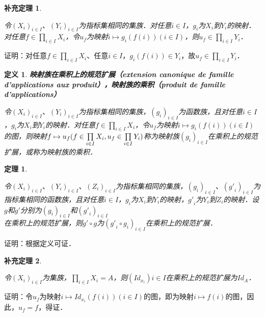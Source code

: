 \documentclass[12pt, a4paper, oneside]{book}
\newtheorem{theo}{定理}
\newtheorem{cor}{补充定理}
\newtheorem{de}{定义}
\begin{document}
			\begin{cor}\label{cor140}
				\hfill\par
				令$(X_i)_{i\in I}$、$(Y_i)_{i\in I}$为指标集相同的集族．对任意$i\in I$，$g_i$为$X_i$到$Y_i$的映射．对任意$f\in \prod\limits_{i\in I}X_i$，令$u_f$为映射$i\mapsto g_i(f(i))(i\in I)$，则$u_f\in \prod\limits_{i\in I}Y_i$．
			\end{cor}
			证明：对任意$f\in \prod\limits_{i\in I}X_i$、任意$i\in I$，$g_i(f(i))\in Y_i$，故$u_f\in \prod\limits_{i\in I}Y_i$．
			
			\begin{de}
				\textbf{映射族在乘积上的规范扩展（extension canonique de famille d'applications aux produit），映射族的乘积（produit de famille d'applications）}
				\par
				令$(X_i)_{i\in I}$、$(Y_i)_{i\in I}$为指标集相同的集族，$(g_i)_{i\in I}$为函数族，且对任意$i\in I$，$g_i$为$X_i$到$Y_i$的映射．对任意$f\in \prod\limits_{i\in I}X_i$，令$u_f$为映射$i\mapsto g_i(f(i))(i\in I)$的图，则映射$f\mapsto u_f(f\in \prod\limits_{i\in I}X_i, u_f\\\in \prod\limits_{i\in I}Y_i)$称为映射族$(g_i)_{i\in I}$在乘积上的规范扩展，或称为映射族的乘积．
			\end{de}
			
			\begin{theo}\label{theo54}
				\hfill\par
				令$(X_i)_{i\in I}$、$(Y_i)_{i\in I}$、$(Z_i)_{i\in I}$为指标集相同的集族，$(g_i)_{i\in I}$、$({g'}_i)_{i\in I}$为指标集相同的函数族，且对任意$i\in I$，$g_i$为$X_i$到$Y_i$的映射，${g'}_i$为$Y_i$到$Z_i$的映射．设$g$和$g'$分别为$(g_i)_{i\in I}$和$({g'}_i)_{i\in I}$\\在乘积上的规范扩展，则$g'\circ g$为$({g'}_i\circ g_i)_{i\in I}$在乘积上的规范扩展．
			\end{theo}
			证明：根据定义可证．
			
			\begin{cor}\label{cor141}
				\hfill\par
				令$(X_i)_{i\in I}$为集族，$\prod\limits_{i\in I}X_i=A$，则$(Id_{x_i}){i\in I}$在乘积上的规范扩展为$Id_A$．
			\end{cor}
			证明：令$u_f$为映射$i\mapsto Id_{x_i}(f(i))(i\in I)$的图，即为映射$i\mapsto f(i)$的图，因此，$u_f=f$，得证．
\end{document}

